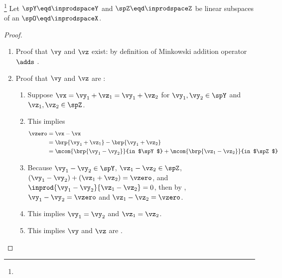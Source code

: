 \begin{theorem}
\footnote{
  }
Let $\spY\eqd\inprodspaceY$ and $\spZ\eqd\inprodspaceZ$ be linear subspaces
of an  $\spO\eqd\inprodspaceX$.
\end{theorem}
\begin{proof}
\begin{enumerate}
  \item Proof that $\vy$ and $\vz$ exist: by definition of Minkowski addition operator $\adds$ .
  \item Proof that $\vy$ and $\vz$ are :
    \begin{enumerate}
      \item Suppose $\vx=\vy_1+\vz_1=\vy_1+ \vz_2$ for $\vy_1,\vy_2\in\spY$ and $\vz_1,\vz_2\in\spZ$.
      \item This implies
        \begin{align*}
          \vzero
            &= \vx-\vx
          \\&= \brp{\vy_1+\vz_1} - \brp{\vy_1+ \vz_2}
          \\&= \mcom{\brp{\vy_1-\vy_2}}{in $\spY$} + \mcom{\brp{\vz_1- \vz_2}}{in $\spZ$}
        \end{align*}
      \item Because $\vy_1-\vy_2\in\spY$, $\vz_1-\vz_2\in\spZ$,
                    $(\vy_1-\vy_2)+(\vz_1+\vz_2)=\vzero$, and
                    $\inprod{\vy_1-\vy_2}{\vz_1-\vz_2}=0$,
            then by , $\vy_1-\vy_2=\vzero$ and $\vz_1-\vz_2=\vzero$.
      \item This implies $\vy_1=\vy_2$ and $\vz_1=\vz_2$.
      \item This implies $\vy$ and $\vz$ are .
    \end{enumerate}
\end{enumerate}
\end{proof}


